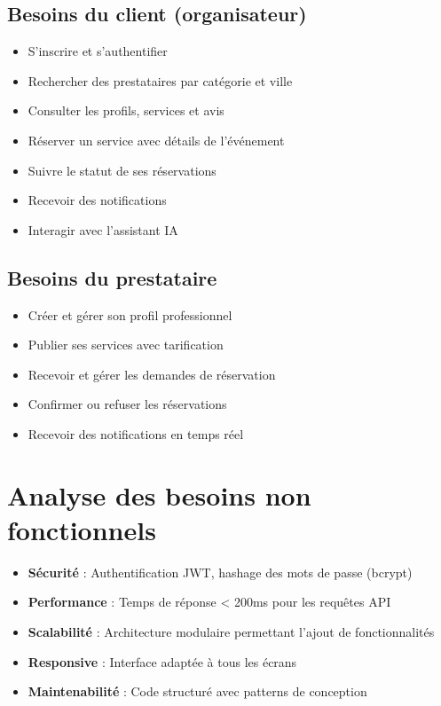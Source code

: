\documentclass[12pt,a4paper]{report}
\begin{document}
\subsection{Besoins du client (organisateur)}
\begin{itemize}
  \item S'inscrire et s'authentifier
  \item Rechercher des prestataires par catégorie et ville
  \item Consulter les profils, services et avis
  \item Réserver un service avec détails de l'événement
  \item Suivre le statut de ses réservations
  \item Recevoir des notifications
  \item Interagir avec l'assistant IA
\end{itemize}

\subsection{Besoins du prestataire}
\begin{itemize}
  \item Créer et gérer son profil professionnel
  \item Publier ses services avec tarification
  \item Recevoir et gérer les demandes de réservation
  \item Confirmer ou refuser les réservations
  \item Recevoir des notifications en temps réel
\end{itemize}

\section{Analyse des besoins non fonctionnels}
\begin{itemize}
  \item \textbf{Sécurité} : Authentification JWT, hashage des mots de passe (bcrypt)
  \item \textbf{Performance} : Temps de réponse < 200ms pour les requêtes API
  \item \textbf{Scalabilité} : Architecture modulaire permettant l'ajout de fonctionnalités
  \item \textbf{Responsive} : Interface adaptée à tous les écrans
  \item \textbf{Maintenabilité} : Code structuré avec patterns de conception
\end{itemize}
\end{document}
